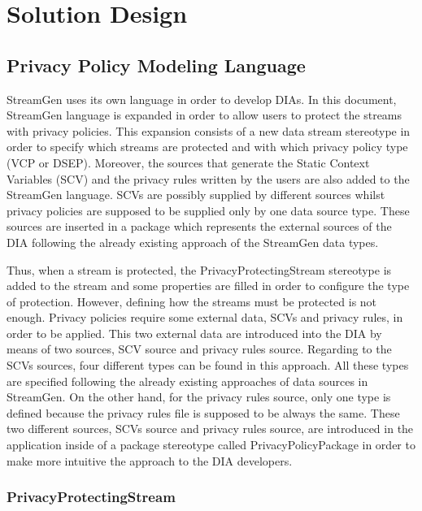 \chapter[Solution Design]{Solution Design}
\label{sec:chapter4}


\section{Privacy Policy Modeling Language}

StreamGen uses its own language in order to develop DIAs. In this document, StreamGen language is expanded in order to allow users to protect the streams with privacy policies. This expansion consists of a new data stream stereotype in order to specify which streams are protected and with which privacy policy type (VCP or DSEP). Moreover, the sources that generate the Static Context Variables (SCV) and the privacy rules written by the users are also added to the StreamGen language. SCVs are possibly supplied by different sources whilst privacy policies are supposed to be supplied only by one data source type. These sources are inserted in a package which represents the external sources of the DIA following the already existing approach of the StreamGen data types.

Thus, when a stream is protected, the PrivacyProtectingStream stereotype is added to the stream and some properties are filled in order to configure the type of protection. However, defining how the streams must be protected is not enough. Privacy policies require some external data, SCVs and privacy rules, in order to be applied. This two external data are introduced into the DIA by means of two sources, SCV source and privacy rules source. Regarding to the SCVs sources, four different types can be found in this approach. All these types are specified following the already existing approaches of data sources in StreamGen. On the other hand, for the privacy rules source, only one type is defined because the privacy rules file is supposed to be always the same. These two different sources, SCVs source and privacy rules source, are introduced in the application inside of a package stereotype called PrivacyPolicyPackage in order to make more intuitive the approach to the DIA developers.

\subsection{PrivacyProtectingStream}


